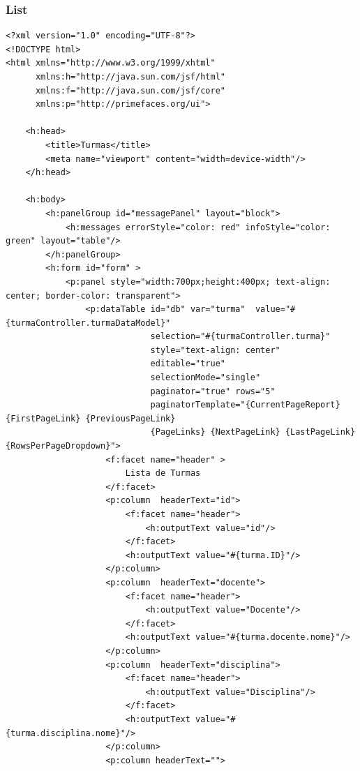\documentclass[12pt,a4paper]{article}
\begin{document}
\subsubsection{List}
\label{subsubsectionTurmaView}
\begin{lstlisting}
<?xml version="1.0" encoding="UTF-8"?>
<!DOCTYPE html>
<html xmlns="http://www.w3.org/1999/xhtml"
      xmlns:h="http://java.sun.com/jsf/html"
      xmlns:f="http://java.sun.com/jsf/core"
      xmlns:p="http://primefaces.org/ui">

    <h:head>
        <title>Turmas</title>
        <meta name="viewport" content="width=device-width"/>
    </h:head>

    <h:body>
        <h:panelGroup id="messagePanel" layout="block">
            <h:messages errorStyle="color: red" infoStyle="color: green" layout="table"/>
        </h:panelGroup>
        <h:form id="form" >
            <p:panel style="width:700px;height:400px; text-align: center; border-color: transparent">  
                <p:dataTable id="db" var="turma"  value="#{turmaController.turmaDataModel}"
                             selection="#{turmaController.turma}"
                             style="text-align: center"
                             editable="true"
                             selectionMode="single"
                             paginator="true" rows="5"  
                             paginatorTemplate="{CurrentPageReport}  {FirstPageLink} {PreviousPageLink} 
                             {PageLinks} {NextPageLink} {LastPageLink} {RowsPerPageDropdown}">  
                    <f:facet name="header" >  
                        Lista de Turmas
                    </f:facet>  
                    <p:column  headerText="id">
                        <f:facet name="header">
                            <h:outputText value="id"/>
                        </f:facet>
                        <h:outputText value="#{turma.ID}"/>
                    </p:column>
                    <p:column  headerText="docente">  
                        <f:facet name="header">
                            <h:outputText value="Docente"/>
                        </f:facet>
                        <h:outputText value="#{turma.docente.nome}"/>
                    </p:column> 
                    <p:column  headerText="disciplina">  
                        <f:facet name="header">
                            <h:outputText value="Disciplina"/>
                        </f:facet>
                        <h:outputText value="#{turma.disciplina.nome}"/>
                    </p:column> 
                    <p:column headerText="">

\end{lstlisting}
\end{document}
